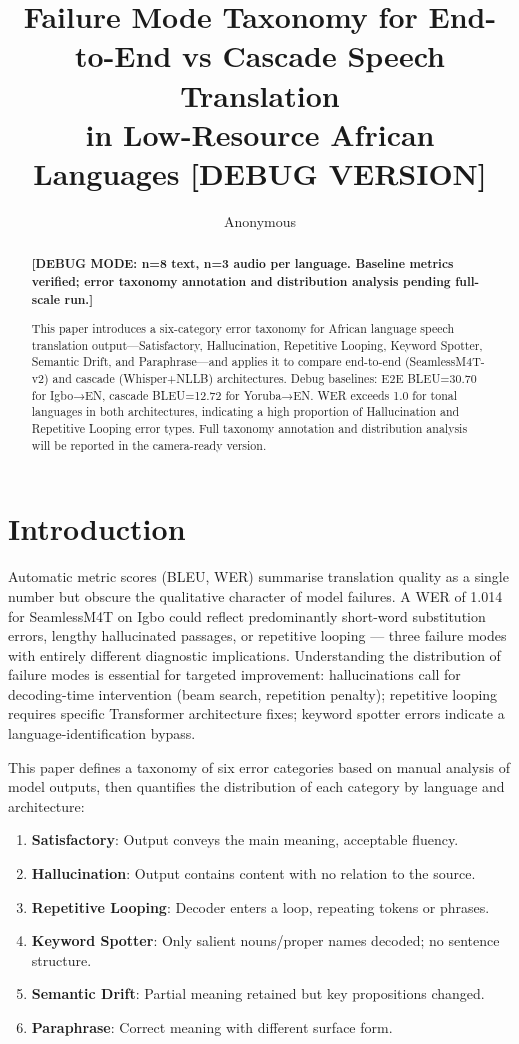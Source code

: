 \documentclass[11pt,a4paper]{article}
\title{Failure Mode Taxonomy for End-to-End vs Cascade Speech Translation\\
in Low-Resource African Languages [DEBUG VERSION]}
\author{Anonymous}
\date{}
\begin{document}
\maketitle

\begin{abstract}
\textbf{[DEBUG MODE: n=8 text, n=3 audio per language. Baseline metrics verified; error taxonomy annotation and distribution analysis pending full-scale run.]}

This paper introduces a six-category error taxonomy for African language speech translation output—Satisfactory, Hallucination, Repetitive Looping, Keyword Spotter, Semantic Drift, and Paraphrase—and applies it to compare end-to-end (SeamlessM4T-v2) and cascade (Whisper+NLLB) architectures. Debug baselines: E2E BLEU=30.70 for Igbo→EN, cascade BLEU=12.72 for Yoruba→EN. WER exceeds 1.0 for tonal languages in both architectures, indicating a high proportion of Hallucination and Repetitive Looping error types. Full taxonomy annotation and distribution analysis will be reported in the camera-ready version.
\end{abstract}

\section{Introduction}
\label{sec:intro}

Automatic metric scores (BLEU, WER) summarise translation quality as a single number but obscure the qualitative character of model failures. A WER of 1.014 for SeamlessM4T on Igbo could reflect predominantly short-word substitution errors, lengthy hallucinated passages, or repetitive looping — three failure modes with entirely different diagnostic implications. Understanding the distribution of failure modes is essential for targeted improvement: hallucinations call for decoding-time intervention (beam search, repetition penalty); repetitive looping requires specific Transformer architecture fixes; keyword spotter errors indicate a language-identification bypass.

This paper defines a taxonomy of six error categories based on manual analysis of model outputs, then quantifies the distribution of each category by language and architecture:
\begin{enumerate}
  \item \textbf{Satisfactory}: Output conveys the main meaning, acceptable fluency.
  \item \textbf{Hallucination}: Output contains content with no relation to the source.
  \item \textbf{Repetitive Looping}: Decoder enters a loop, repeating tokens or phrases.
  \item \textbf{Keyword Spotter}: Only salient nouns/proper names decoded; no sentence structure.
  \item \textbf{Semantic Drift}: Partial meaning retained but key propositions changed.
  \item \textbf{Paraphrase}: Correct meaning with different surface form.
\end{enumerate}
\end{document}

